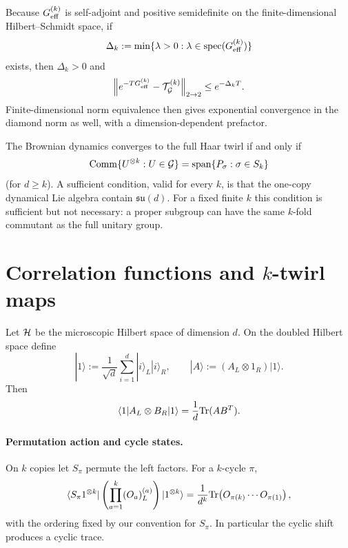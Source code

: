 \documentclass{article}
\theoremstyle{definition}
\begin{document}
Because $G_{\rm eff}^{(k)}$ is self-adjoint and positive semidefinite on the
finite-dimensional Hilbert--Schmidt space, if
\begin{equation}
    \Delta_k
    :=\min\{\lambda>0:\lambda\in{\rm spec}(G_{\rm eff}^{(k)})\}
\end{equation}
exists, then $\Delta_k>0$ and
\begin{equation}
    \left\|
       e^{-TG_{\rm eff}^{(k)}}-{\cal T}_{\cal G}^{(k)}
    \right\|_{2\to2}
    \le e^{-\Delta_kT}.
\end{equation}
Finite-dimensional norm equivalence then gives exponential convergence in
the diamond norm as well, with a dimension-dependent prefactor.

The Brownian dynamics converges to the full Haar twirl if and only if
\begin{equation}
    {\rm Comm}\{U^{\otimes k}:U\in{\cal G}\}
    ={\rm span}\{P_\sigma:\sigma\in S_k\}
\end{equation}
(for $d\ge k$).  A sufficient condition, valid for every $k$, is that the
one-copy dynamical Lie algebra contain $\mathfrak{su}(d)$.  For a fixed
finite $k$ this condition is sufficient but not necessary: a proper
subgroup can have the same $k$-fold commutant as the full unitary group.



\appendix

\section{Correlation functions and $k$-twirl maps}

Let ${\cal H}$ be the microscopic Hilbert space of dimension $d$.  On the
doubled Hilbert space define
\begin{equation}
    |1\rangle
    :=\frac1{\sqrt d}\sum_{i=1}^d|i\rangle_L|i\rangle_R,
    \qquad
    |A\rangle:=(A_L\otimes1_R)|1\rangle.
\end{equation}
Then
\begin{equation}
    \langle1|A_L\otimes B_R|1\rangle
    =\frac1d{\rm Tr}(AB^T).
\end{equation}

\paragraph{Permutation action and cycle states.}
On $k$ copies let $S_\pi$ permute the left factors.  For a $k$-cycle
$\pi$,
\begin{equation}
    \langle S_\pi1^{\otimes k}|
    \left(\prod_{a=1}^k(O_a)_L^{(a)}\right)
    |1^{\otimes k}\rangle
    =\frac1{d^k}
      {\rm Tr}\!\left(O_{\pi(k)}\cdots O_{\pi(1)}\right),
\end{equation}
with the ordering fixed by our convention for $S_\pi$.  In particular the
cyclic shift produces a cyclic trace.
\end{document}
